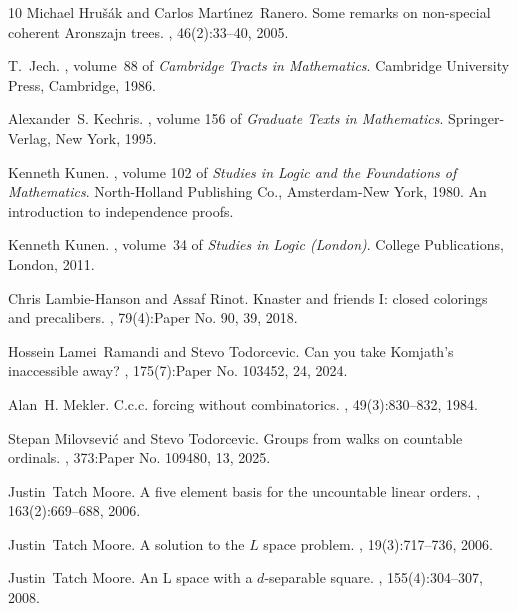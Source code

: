 \documentclass{article}
\begin{document}
\begin{thebibliography}{10}
Michael Hru\v{s}\'{a}k and Carlos Mart\'{\i}nez~Ranero.
\newblock Some remarks on non-special coherent {A}ronszajn trees.
, 46(2):33--40, 2005.

T.~Jech.
, volume~88 of {\em Cambridge Tracts in
  Mathematics}.
\newblock Cambridge University Press, Cambridge, 1986.

Alexander~S. Kechris.
, volume 156 of {\em Graduate
  Texts in Mathematics}.
\newblock Springer-Verlag, New York, 1995.

Kenneth Kunen.
, volume 102 of {\em Studies in Logic and the
  Foundations of Mathematics}.
\newblock North-Holland Publishing Co., Amsterdam-New York, 1980.
\newblock An introduction to independence proofs.

Kenneth Kunen.
, volume~34 of {\em Studies in Logic (London)}.
\newblock College Publications, London, 2011.

Chris Lambie-Hanson and Assaf Rinot.
\newblock Knaster and friends {I}: closed colorings and precalibers.
, 79(4):Paper No. 90, 39, 2018.

Hossein Lamei~Ramandi and Stevo Todorcevic.
\newblock Can you take {K}omjath's inaccessible away?
, 175(7):Paper No. 103452, 24, 2024.

Alan~H. Mekler.
\newblock C.c.c. forcing without combinatorics.
, 49(3):830--832, 1984.

Stepan Milovsevi\'c and Stevo Todorcevic.
\newblock Groups from walks on countable ordinals.
, 373:Paper No. 109480, 13, 2025.

Justin~Tatch Moore.
\newblock A five element basis for the uncountable linear orders.
, 163(2):669--688, 2006.

Justin~Tatch Moore.
\newblock A solution to the {$L$} space problem.
, 19(3):717--736, 2006.

Justin~Tatch Moore.
\newblock An {L} space with a {$d$}-separable square.
, 155(4):304--307, 2008.


\end{thebibliography}
\end{document}
